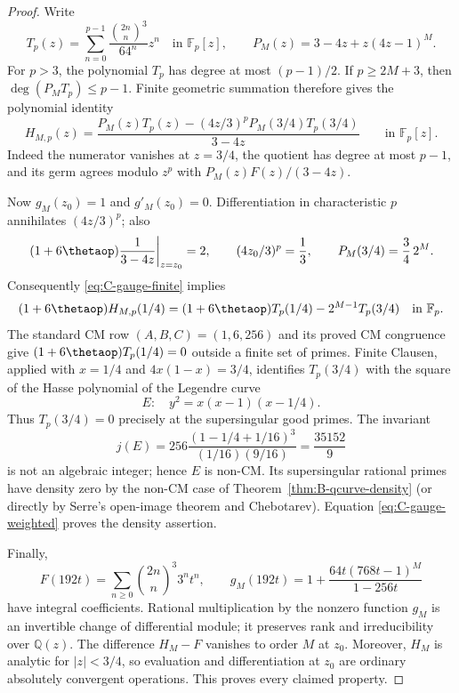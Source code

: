 \begin{proof}
Write
\[
 T_p(z)=\sum_{n=0}^{p-1}\frac{\binom{2n}{n}^3}{64^n}z^n
 \quad\text{in }\mathbb F_p[z],\qquad
 P_M(z)=3-4z+z(4z-1)^M.
\]
For $p>3$, the polynomial $T_p$ has degree at most $(p-1)/2$.
If $p\ge2M+3$, then $\deg(P_MT_p)\le p-1$.
Finite geometric summation therefore gives the polynomial identity
\begin{equation}\label{eq:C-gauge-finite}
 H_{M,p}(z)=
 \frac{P_M(z)T_p(z)-(4z/3)^pP_M(3/4)T_p(3/4)}{3-4z}
 \qquad\text{in }\mathbb F_p[z].
\end{equation}
Indeed the numerator vanishes at $z=3/4$, the quotient has degree
at most $p-1$, and its germ agrees modulo $z^p$ with
$P_M(z)F(z)/(3-4z)$.

Now $g_M(z_0)=1$ and $g'_M(z_0)=0$.  Differentiation in
characteristic $p$ annihilates $(4z/3)^p$; also
\[
 \left.(1+6\thetaop)\frac1{3-4z}\right|_{z=z_0}=2,
 \qquad (4z_0/3)^p=\frac13,
 \qquad P_M(3/4)=\frac34\,2^M.
\]
Consequently \eqref{eq:C-gauge-finite} implies
\begin{equation}\label{eq:C-gauge-weighted}
 (1+6\thetaop)H_{M,p}(1/4)
 =(1+6\thetaop)T_p(1/4)-2^{M-1}T_p(3/4)
 \quad\text{in }\mathbb F_p.
\end{equation}
The standard CM row $(A,B,C)=(1,6,256)$ and its proved CM
congruence give $(1+6\thetaop)T_p(1/4)=0$ outside a finite set
of primes.  Finite Clausen, applied with $x=1/4$ and
$4x(1-x)=3/4$, identifies $T_p(3/4)$ with the square of
the Hasse polynomial of the Legendre curve
\[
 E:\quad y^2=x(x-1)(x-1/4).
\]
Thus $T_p(3/4)=0$ precisely at the supersingular good primes.
The invariant
\[
 j(E)=256\frac{(1-1/4+1/16)^3}{(1/16)(9/16)}
     =\frac{35152}{9}
\]
is not an algebraic integer; hence $E$ is non-CM.  Its
supersingular rational primes have density zero by the non-CM
case of Theorem~\ref{thm:B-qcurve-density} (or directly by Serre's
open-image theorem and Chebotarev).  Equation
\eqref{eq:C-gauge-weighted} proves the density assertion.

Finally,
\[
 F(192t)=\sum_{n\ge0}\binom{2n}{n}^3 3^n t^n,
 \qquad
 g_M(192t)=1+\frac{64t(768t-1)^M}{1-256t}
\]
have integral coefficients.  Rational multiplication by the nonzero
function $g_M$ is an invertible change of differential module;
it preserves rank and irreducibility over $\mathbb Q(z)$.
The difference $H_M-F$ vanishes to order $M$ at $z_0$.
Moreover, $H_M$ is analytic for $|z|<3/4$, so evaluation and
differentiation at $z_0$ are ordinary absolutely convergent
operations.  This proves every claimed property.
\end{proof}


